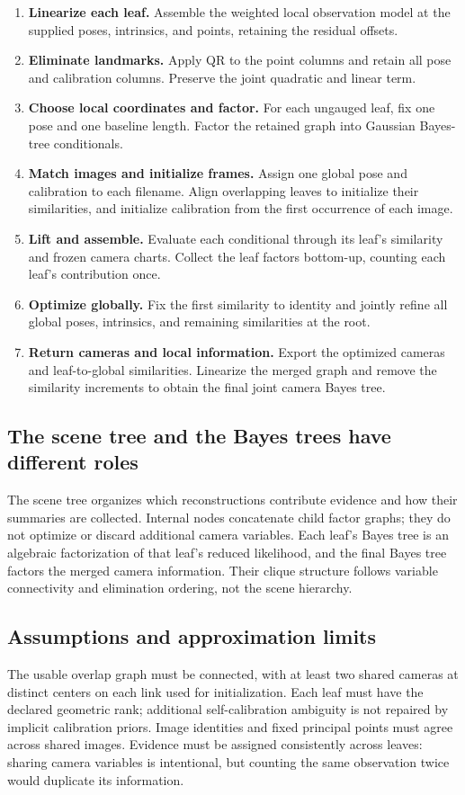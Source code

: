 \documentclass[11pt,letterpaper]{article}
\begin{document}
\begin{enumerate}[itemsep=2pt]
\item \textbf{Linearize each leaf.} Assemble the weighted local observation model
at the supplied poses, intrinsics, and points, retaining the residual offsets.
\item \textbf{Eliminate landmarks.} Apply QR to the point columns and retain all
pose and calibration columns. Preserve the joint quadratic and linear term.
\item \textbf{Choose local coordinates and factor.} For each ungauged leaf, fix
one pose and one baseline length. Factor the retained graph into Gaussian
Bayes-tree conditionals.
\item \textbf{Match images and initialize frames.} Assign one global pose and
calibration to each filename. Align overlapping leaves to initialize their
similarities, and initialize calibration from the first occurrence of each image.
\item \textbf{Lift and assemble.} Evaluate each conditional through its leaf's
similarity and frozen camera charts. Collect the leaf factors bottom-up, counting
each leaf's contribution once.
\item \textbf{Optimize globally.} Fix the first similarity to identity and jointly
refine all global poses, intrinsics, and remaining similarities at the root.
\item \textbf{Return cameras and local information.} Export the optimized cameras
and leaf-to-global similarities. Linearize the merged graph and remove the
similarity increments to obtain the final joint camera Bayes tree.
\end{enumerate}

\subsection{The scene tree and the Bayes trees have different roles}
The scene tree organizes which reconstructions contribute evidence and how their
summaries are collected. Internal nodes concatenate child factor graphs; they do
not optimize or discard additional camera variables. Each leaf's Bayes tree is
an algebraic factorization of that leaf's reduced likelihood, and the final Bayes
tree factors the merged camera information. Their clique structure follows
variable connectivity and elimination ordering, not the scene hierarchy.

\subsection{Assumptions and approximation limits}
The usable overlap graph must be connected, with at least two shared cameras at
distinct centers on each link used for initialization. Each leaf must have the
declared geometric rank; additional self-calibration ambiguity is not repaired
by implicit calibration priors. Image identities and fixed principal points must
agree across shared images. Evidence must be assigned consistently across leaves:
sharing camera variables is intentional, but counting the same observation twice
would duplicate its information.
\end{document}
